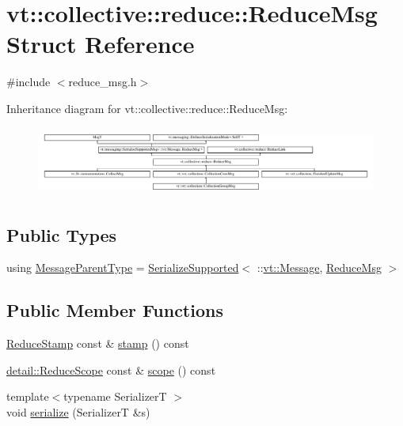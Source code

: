 \hypertarget{structvt_1_1collective_1_1reduce_1_1_reduce_msg}{}\section{vt\+:\+:collective\+:\+:reduce\+:\+:Reduce\+Msg Struct Reference}
\label{structvt_1_1collective_1_1reduce_1_1_reduce_msg}


{\ttfamily \#include $<$reduce\+\_\+msg.\+h$>$}

Inheritance diagram for vt\+:\+:collective\+:\+:reduce\+:\+:Reduce\+Msg\+:\begin{figure}[H]
\begin{center}
\leavevmode
\includegraphics[height=2.304527cm]{structvt_1_1collective_1_1reduce_1_1_reduce_msg}
\end{center}
\end{figure}
\subsection*{Public Types}
\begin{DoxyCompactItemize}
\item 
using \hyperlink{structvt_1_1collective_1_1reduce_1_1_reduce_msg_a5c736b83ddd821bdce047715e0b606f2}{Message\+Parent\+Type} = \hyperlink{namespacevt_a3862b8e3f67ab03f3a4313d828592fa9}{Serialize\+Supported}$<$ \+::\hyperlink{namespacevt_a3a3ddfef40b4c90915fa43cdd5f129ea}{vt\+::\+Message}, \hyperlink{structvt_1_1collective_1_1reduce_1_1_reduce_msg}{Reduce\+Msg} $>$
\end{DoxyCompactItemize}
\subsection*{Public Member Functions}
\begin{DoxyCompactItemize}
\item 
\hyperlink{namespacevt_1_1collective_1_1reduce_a7b7cb3021ac5654d92825d9fab0250b2}{Reduce\+Stamp} const  \& \hyperlink{structvt_1_1collective_1_1reduce_1_1_reduce_msg_a7b2f5ab707e75bc16a244759dfbecdd6}{stamp} () const
\item 
\hyperlink{structvt_1_1collective_1_1reduce_1_1detail_1_1_reduce_scope}{detail\+::\+Reduce\+Scope} const  \& \hyperlink{structvt_1_1collective_1_1reduce_1_1_reduce_msg_a7b31a26204ab86778a9058e42589e549}{scope} () const
\item 
{\footnotesize template$<$typename SerializerT $>$ }\\void \hyperlink{structvt_1_1collective_1_1reduce_1_1_reduce_msg_acd139b8eebfbd0ea925dac39032e5717}{serialize} (SerializerT \&s)
\end{DoxyCompactItemize}

